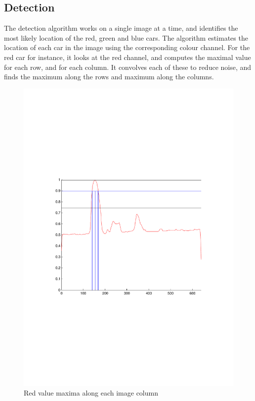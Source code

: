 \documentclass{article}
\begin{document}
\subsection{Detection}
\label{sec:detection}

The detection algorithm works on a single image at a time, and identifies the most likely location of the red, green and blue cars. The algorithm estimates the location of each car in the image using the corresponding colour channel. For the red car for instance, it looks at the red channel, and computes the maximal value for each row, and for each column. It convolves each of these to reduce noise, and finds the maximum along the rows and maximum along the columns.

\begin{figure}[htbp!]
  \centering
    \includegraphics[width=1.0\textwidth]{../Drawings/yMaxima.pdf}
    \caption{Red value maxima along each image column}
    \label{fig:maxima}
\end{figure}
\end{document}
